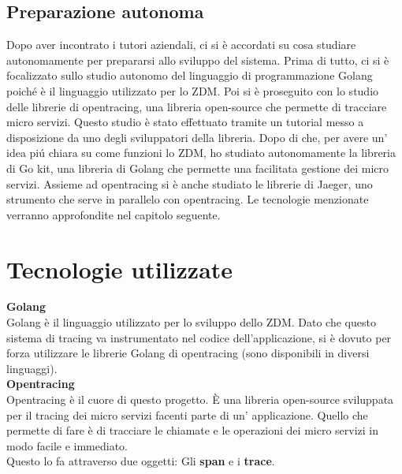 \documentclass[a4paper,12pt,titlepage,italian,openany]{report}
\begin{document}
\section{Preparazione autonoma}
Dopo aver incontrato i tutori aziendali, ci si è accordati su cosa studiare autonomamente per prepararsi allo sviluppo del sistema.
Prima di tutto, ci si è focalizzato  sullo studio autonomo del linguaggio di programmazione Golang poiché è il linguaggio utilizzato per lo ZDM\cite{zdm:1}.
Poi si è proseguito con lo studio delle librerie di opentracing\cite{opentracing:1}, una libreria open-source che permette di tracciare micro servizi.
Questo studio è stato effettuato tramite un tutorial\cite{opentracing:2} messo a disposizione da uno degli sviluppatori della libreria. Dopo di che, per avere un' idea piú chiara su come funzioni lo ZDM,
ho studiato autonomamente la libreria di Go kit\cite{go:2}, una libreria di Golang che permette una facilitata gestione dei micro servizi.
Assieme ad opentracing\cite{opentracing:1} si è anche studiato le librerie di Jaeger\cite{jaeger:1}, uno strumento che serve in parallelo con opentracing\cite{opentracing:1}.
Le tecnologie menzionate verranno approfondite nel capitolo seguente.
\chapter{Tecnologie utilizzate}
\textbf{Golang}\\
Golang\cite{go:1} è il linguaggio utilizzato per lo sviluppo dello ZDM. Dato che questo sistema di tracing va instrumentato nel codice dell'applicazione, si è dovuto per forza utilizzare le librerie
Golang di opentracing (sono disponibili in diversi linguaggi).\\[12pt]

\textbf{Opentracing}\\
Opentracing\cite{opentracing:1} è il cuore di questo progetto. È una libreria open-source sviluppata per il tracing dei micro servizi facenti parte di un' applicazione.
Quello che permette di fare è di tracciare le chiamate e le operazioni dei micro servizi in modo facile e immediato.
\\Questo lo fa attraverso due oggetti: Gli \textbf{span} e i \textbf{trace}.\\
\end{document}
